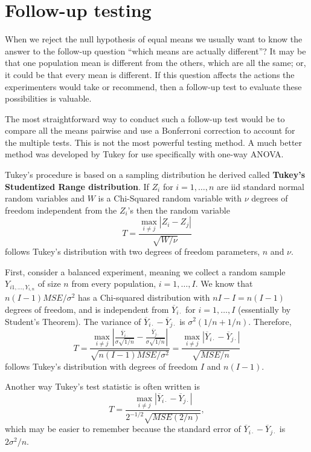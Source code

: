 \documentclass[
]{book}
\begin{document}
\hypertarget{follow-up-testing}{%
\section{Follow-up testing}\label{follow-up-testing}}

When we reject the null hypothesis of equal means we usually want to know the answer to the follow-up question ``which means are actually different''? It may be that one population mean is different from the others, which are all the same; or, it could be that every mean is different. If this question affects the actions the experimenters would take or recommend, then a follow-up test to evaluate these possibilities is valuable.

The most straightforward way to conduct such a follow-up test would be to compare all the means pairwise and use a Bonferroni correction to account for the multiple tests. This is not the most powerful testing method. A much better method was developed by Tukey for use specifically with one-way ANOVA.

Tukey's procedure is based on a sampling distribution he derived called \textbf{Tukey's Studentized Range distribution}. If \(Z_i\) for \(i=1,\ldots, n\) are iid standard normal random variables and \(W\) is a Chi-Squared random variable with \(\nu\) degrees of freedom independent from the \(Z_i\)'s then the random variable
\[T = \frac{\max_{i\ne j}|Z_i - Z_j|}{\sqrt{W/\nu}}\]
follows Tukey's distribution with two degrees of freedom parameters, \(n\) and \(\nu\).

First, consider a balanced experiment, meaning we collect a random sample \(Y_{i1, \ldots, Y_{i,n}}\) of size \(n\) from every population, \(i=1, \ldots, I\). We know that \(n(I-1)MSE/\sigma^2\) has a Chi-squared distribution with \(nI-I = n(I-1)\) degrees of freedom, and is independent from \(\overline Y_{i\cdot}\) for \(i=1, \ldots, I\) (essentially by Student's Theorem). The variance of \(\overline Y_{i\cdot} - \overline Y_{j\cdot}\) is \(\sigma^2(1/n + 1/n)\). Therefore,
\[T = \frac{\max_{i\ne j}\left|\frac{\overline Y_{i\cdot}}{\sigma\sqrt{1/n}} - \frac{\overline Y_{j\cdot}}{{\sigma\sqrt{1/n}}}\right|}{\sqrt{n(I-1)MSE/\sigma^2}} = \frac{\max_{i\ne j}\left|\overline Y_{i\cdot} - \overline Y_{j\cdot}\right|}{\sqrt{MSE/n}}\]
follows Tukey's distribution with degrees of freedom \(I\) and \(n(I-1)\).

Another way Tukey's test statistic is often written is
\[T = \frac{\max_{i\ne j}\left|\overline Y_{i\cdot} - \overline Y_{j\cdot}\right|}{2^{-1/2}\sqrt{MSE(2/n)}},\]
which may be easier to remember because the standard error of \(\overline Y_{i\cdot} - \overline Y_{j\cdot}\) is \(2\sigma^2/n\).
\end{document}

